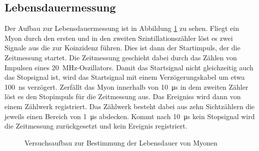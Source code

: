 \subsection{Lebensdauermessung}
Der Aufbau zur Lebensdauermessung ist in Abbildung \ref{fig:lebensdauer_aufbau} zu sehen. Fliegt ein Myon durch den ersten und in den zweiten Szintillationszähler löst es zwei Signale aus die zur Koinzidenz führen. Dies ist dann der Startimpuls, der die Zeitmessung startet. Die Zeitmessung geschieht dabei durch das Zählen von Impulsen eines \SI{20}{\mega\hertz}-Oszillators. Damit das Startsignal nicht gleichzeitig auch das Stopsignal ist, wird das Startsignal mit einem Verzögerungskabel um etwa \SI{100}{\nano\second} verzögert. Zerfällt das Myon innerhalb von \SI{10}{\micro\second} in dem zweiten Zähler löst es den Stopimpuls für die Zeitmessung aus. Das Ereigniss wird dann von einem Zählwerk registriert. Das Zählwerk besteht dabei aus zehn Sichtzählern die jeweils einen Bereich von \SI{1}{\micro\second} abdecken. Kommt nach \SI{10}{\micro\second} kein Stopsignal wird die Zeitmessung zurückgesetzt und kein Ereignis registriert. 

\begin{figure}[h]
  \centering
  \caption{Versuchsaufbau zur Bestimmung der Lebensdauer von Myonen}
  \label{fig:lebensdauer_aufbau}
\end{figure}

